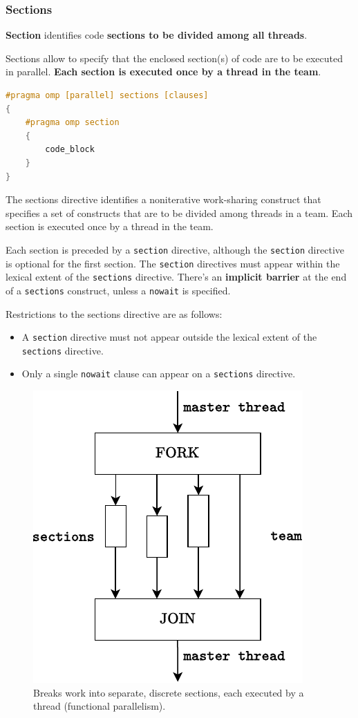 \newpage

\subsubsection{Sections}

\textbf{Section} identifies code \textbf{sections to be divided among all threads}.

\highspace
Sections allow to specify that the enclosed section(s) of code are to be executed in parallel. \textbf{Each section is executed once by a thread in the team}.

\begin{openmpbox}[: sections]
\begin{lstlisting}[language=C++]
#pragma omp [parallel] sections [clauses]
{
    #pragma omp section
    {
        code_block
    }
}\end{lstlisting}
\end{openmpbox}

\noindent
The sections directive identifies a noniterative work-sharing construct that specifies a set of constructs that are to be divided among threads in a team. Each section is executed once by a thread in the team.

\highspace
Each section is preceded by a \texttt{section} directive, although the \texttt{section} directive is optional for the first section. The \texttt{section} directives must appear within the lexical extent of the \texttt{sections} directive. There's an \textbf{implicit barrier} at the end of a \texttt{sections} construct, unless a \texttt{nowait} is specified.

\highspace
Restrictions to the sections directive are as follows:
\begin{itemize}
    \item A \texttt{section} directive must not appear outside the lexical extent of the \texttt{sections} directive.
    \item Only a single \texttt{nowait} clause can appear on a \texttt{sections} directive.
\end{itemize}

\begin{figure}[!htp]
    \centering
    \includegraphics[width=.45\textwidth]{img/openmp-sections-1.pdf}
    \caption{Breaks work into separate, discrete sections, each executed by a thread (functional parallelism).}
\end{figure}

